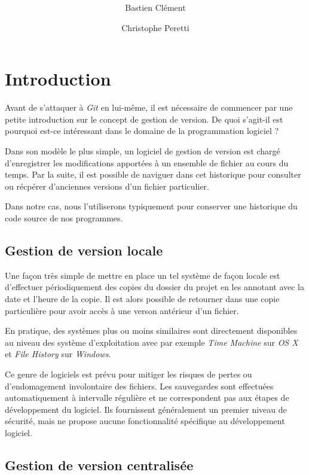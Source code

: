 \documentclass[11pt,a4paper]{article}
\author{Bastien Clément \and Christophe Peretti}
\title{{\normalsize \doccourse} \\ \doctitle }
\begin{document}
\maketitle
\vspace{3em}

\tableofcontents

\section{Introduction}

Avant de s'attaquer à \textit{Git} en lui-même, il est nécessaire de commencer par une petite introduction sur le concept de gestion de version. De quoi s'agit-il est pourquoi est-ce intéressant dans le domaine de la programmation logiciel ?

Dans son modèle le plus simple, un logiciel de gestion de version est chargé d'enregistrer les modifications apportées à un ensemble de fichier au cours du temps. Par la suite, il est possible de naviguer dans cet historique pour consulter ou récpérer d'anciennes versions d'un fichier particulier.

Dans notre cas, nous l'utiliserons typiquement pour conserver une historique du code source de nos programmes.

\subsection{Gestion de version locale}

Une façon très simple de mettre en place un tel système de façon locale est d'effectuer périodiquement des copies du dossier du projet en les annotant avec la date et l'heure de la copie. Il est alors possible de retourner dans une copie particulière pour avoir accès à une verson antérieur d'un fichier.

En pratique, des systèmes plus ou moins similaires sont directement disponibles au niveau des système d'exploitation avec par exemple \textit{Time Machine} sur \textit{OS X} et \textit{File History} sur \textit{Windows}.

Ce genre de logiciels est prévu pour mitiger les risques de pertes ou d'endomagement involontaire des fichiers. Les sauvegardes sont effectuées automatiquement à intervalle régulière et ne correspondent pas aux étapes de développement du logiciel. Ils fournissent généralement un premier niveau de sécurité, mais ne propose aucune fonctionnalité spécifique au développement logiciel.

\subsection{Gestion de version centralisée}
\end{document}
